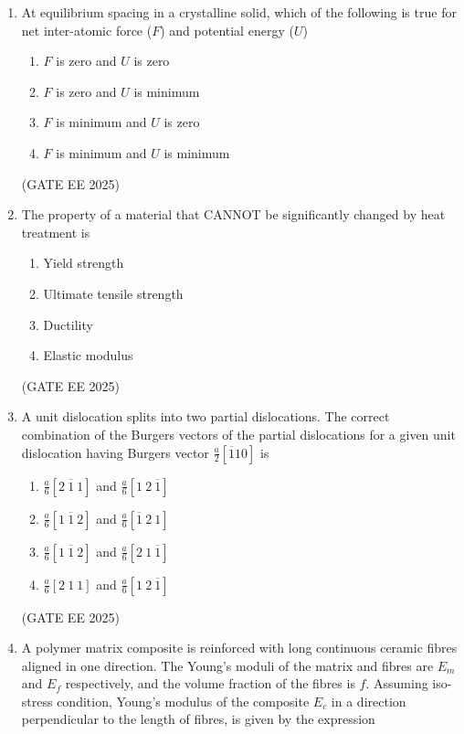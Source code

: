 \documentclass[11pt, letterpaper]{article}
\theoremstyle{remark}
\begin{document}
\begin{enumerate}
\item At equilibrium spacing in a crystalline solid, which of the following is true for net inter-atomic force ($F$) and potential energy ($U$)  
\begin{multicols}{2}
\begin{enumerate}  
\item $F$ is zero and $U$ is zero
\item $F$ is zero and $U$ is minimum
\item $F$ is minimum and $U$ is zero
\item $F$ is minimum and $U$ is minimum
\end{enumerate}
\end{multicols}
\hfill(GATE EE 2025)
 

\item The property of a material that CANNOT be significantly changed by heat treatment is  
\begin{multicols}{2}
\begin{enumerate}  
\item Yield strength
\item Ultimate tensile strength
\item Ductility
\item Elastic modulus
\end{enumerate}
\end{multicols}
\hfill(GATE EE 2025)

\item A unit dislocation splits into two partial dislocations. The correct combination of the Burgers vectors of the partial dislocations for a given unit dislocation having Burgers vector \( \frac{a}{2}[\overline{1}10] \) is

\begin{multicols}{2}
\begin{enumerate}  
\item \( \frac{a}{6} [2\ \overline{1}\ 1] \) and \( \frac{a}{6} [1\ 2\ \overline{1}] \)
\item \( \frac{a}{6} [1\ \overline{1}\ 2] \) and \( \frac{a}{6} [\overline{1}\ 2\ 1] \)
\item \( \frac{a}{6} [1\ \overline{1}\ 2] \) and \( \frac{a}{6} [2\ 1\ \overline{1}] \)
\item \( \frac{a}{6} [2\ 1\ 1] \) and \( \frac{a}{6} [1\ 2\ \overline{1}] \)
\end{enumerate}
\end{multicols}
\hfill(GATE EE 2025)


\item A polymer matrix composite is reinforced with long continuous ceramic fibres aligned in one direction. The Young’s moduli of the matrix and fibres are \(E_m\) and \(E_f\) respectively, and the volume fraction of the fibres is \(f\). Assuming iso-stress condition, Young’s modulus of the composite \(E_c\) in a direction perpendicular to the length of fibres, is given by the expression


\end{enumerate}
\end{document}
